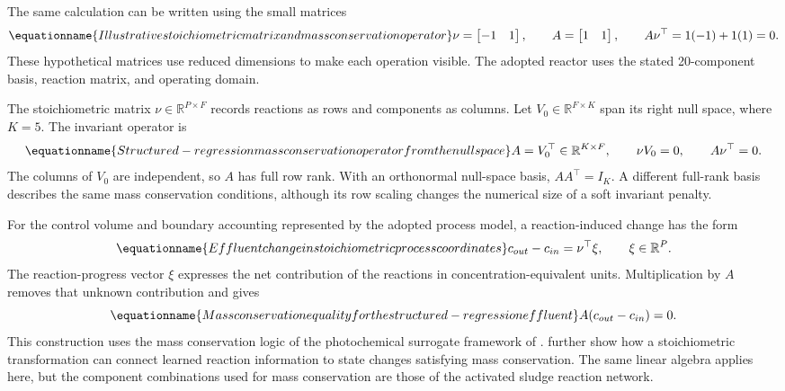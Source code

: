 The same calculation can be written using the small matrices
\begin{equation}
\equationname{Illustrative stoichiometric matrix and mass conservation operator}
\label{eq:icsor_small_inventory_matrices}
\nu=\begin{bmatrix}-1&1\end{bmatrix},
\qquad
A=\begin{bmatrix}1&1\end{bmatrix},
\qquad
A\nu^\top=1(-1)+1(1)=0.
\end{equation}
These hypothetical matrices use reduced dimensions to make each operation visible. The adopted reactor uses the stated 20-component basis, reaction matrix, and operating domain.

The stoichiometric matrix \(\nu\in\mathbb{R}^{P\times F}\) records reactions as rows and components as columns. Let \(V_0\in\mathbb{R}^{F\times K}\) span its right null space, where \(K=5\). The invariant operator is
\begin{equation}
\equationname{Structured-regression mass conservation operator from the null space}
\label{eq:icsor_invariant_operator}
A=V_0^\top\in\mathbb{R}^{K\times F},
\qquad \nu V_0=0,
\qquad A\nu^\top=0.
\end{equation}
The columns of \(V_0\) are independent, so \(A\) has full row rank. With an orthonormal null-space basis, \(AA^\top=I_K\). A different full-rank basis describes the same mass conservation conditions, although its row scaling changes the numerical size of a soft invariant penalty.

For the control volume and boundary accounting represented by the adopted process model, a reaction-induced change has the form
\begin{equation}
\equationname{Effluent change in stoichiometric process coordinates}
\label{eq:icsor_stoichiometric_change}
c_{out}-c_{in}=\nu^\top\xi,
\qquad \xi\in\mathbb{R}^{P}.
\end{equation}
The reaction-progress vector \(\xi\) expresses the net contribution of the reactions in concentration-equivalent units. Multiplication by \(A\) removes that unknown contribution and gives
\begin{equation}
\equationname{Mass conservation equality for the structured-regression effluent}
\label{eq:icsor_invariant_balance}
A(c_{out}-c_{in})=0.
\end{equation}
This construction uses the mass conservation logic of the photochemical surrogate framework of \citet{SturmWexler2020}. \citet{SturmWexler2022} further show how a stoichiometric transformation can connect learned reaction information to state changes satisfying mass conservation. The same linear algebra applies here, but the component combinations used for mass conservation are those of the activated sludge reaction network.

